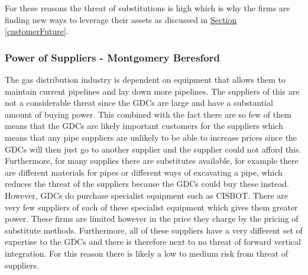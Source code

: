 \documentclass[11pt]{article}		%
\newcommand{\supercite}[1]{\textsuperscript{\cite{#1}}}		%
\newcommand{\sectref}[1]{\hyperref[#1]{Section \ref*{#1}}}     %
\begin{document}
                For these reasons the threat of substitutions is high which is why the firms are finding new ways to leverage their assets as discussed in \sectref{customerFuture}.%

     
		\subsubsection[Power of Suppliers]{Power of Suppliers - Montgomery Beresford}
		         
                \hspace*{2ex}
		        The gas distribution industry is dependent on equipment that allows them to maintain current pipelines and lay down more pipelines.
		        The suppliers of this are not a considerable threat since the GDCs are large and have a substantial amount of buying power. This combined with the fact there are so few of them means that the GDCs are likely important customers for the suppliers which means that any pipe suppliers are unlikely to be able to increase prices since the GDCs will then just go to another supplier and the supplier could not afford this. Furthermore, for many supplies there are substitutes available, for example there are different materials for pipes or different ways of excavating a pipe, which reduces the threat of the suppliers because the GDCs could buy these instead.
                \\
                \hspace*{2ex}However, GDCs do purchase specialist equipment such as CISBOT. There are very few suppliers of each of these specialist equipment which gives them greater power. These firms are limited however in the price they charge by the pricing of substitute methods. Furthermore, all of these suppliers have a very different set of expertise to the GDCs and there is therefore next to no threat of forward vertical integration.
                For this reason there is likely a low to medium risk from threat of suppliers.
\end{document}
